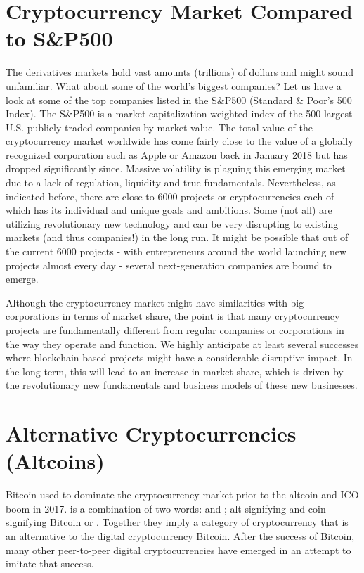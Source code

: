 \section{Cryptocurrency Market Compared to S\&P500}
The derivatives markets hold vast amounts (trillions) of dollars and might sound unfamiliar. What about some of the world's biggest companies? Let us have a look at some of the top companies listed in the S\&P500 (Standard \& Poor's 500 Index). The S\&P500 is a market-capitalization-weighted index of the 500 largest U.S. publicly traded companies by market value. The total value of the cryptocurrency market worldwide has come fairly close to the value of a globally recognized corporation such as Apple or Amazon back in January 2018 but has dropped significantly since. Massive volatility is plaguing this emerging market due to a lack of regulation, liquidity and true fundamentals.
Nevertheless, as indicated before, there are close to 6000 projects or cryptocurrencies each of which has its individual and unique goals and ambitions. Some (not all) are utilizing revolutionary new technology and can be very disrupting to existing markets (and thus companies!) in the long run. It might be possible that out of the current 6000 projects - with entrepreneurs around the world launching new projects almost every day - several next-generation companies are bound to emerge.\medskip 

Although the cryptocurrency market might have similarities with big corporations in terms of market share, the point is that many cryptocurrency projects are fundamentally different from regular companies or corporations in the way they operate and function. We highly anticipate at least several successes where blockchain-based projects might have a considerable disruptive impact. In the long term, this will lead to an increase in market share, which is driven by the revolutionary new fundamentals and business models of these new businesses.

\section{Alternative Cryptocurrencies (Altcoins)}
Bitcoin used to dominate the cryptocurrency market prior to the altcoin and ICO boom in 2017.  is a combination of two words:  and ; alt signifying  and coin signifying Bitcoin or . Together they imply a category of cryptocurrency that is an alternative to the digital cryptocurrency Bitcoin. After the success of Bitcoin, many other peer-to-peer digital cryptocurrencies have emerged in an attempt to imitate that success. 

